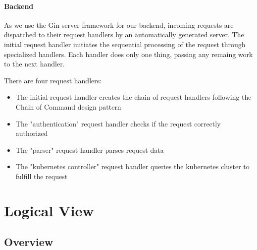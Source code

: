 \documentclass[a4paper,12pt,chapterprefix=false,bibliography=totoc,listof=totoc,]{scrreprt}
\begin{document}
\subsubsection{Backend}
As we use the Gin server framework for our backend, incoming requests are dispatched to their request handlers by an automatically generated server. The initial request handler initiates the sequential processing of the request through specialized handlers. Each handler does only one thing, passing any remaing work to the next handler.

There are four request handlers:
\begin{itemize}
	\item The initial request handler creates the chain of request handlers following the Chain of Command design pattern
	\item The "authentication" request handler checks if the request correctly authorized
	\item The "parser" request handler parses request data
	\item The "kubernetes controller" request handler queries the kubernetes cluster to fulfill the request 
\end{itemize}

\chapter{Logical View}

\section{Overview}
\end{document}
